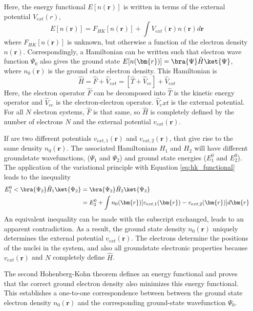 Here, the energy functional $E[n(\bm{r})]$ is written in terms of the external potential $V_{ext}(r)$,
\begin{equation}
	\label{eq:hk_functional}
	E[n(\bm{r})] = F_{HK}[n(\bm{r})]+\int V_{ext}(\bm{r})n(\bm{r})d\bm{r}
\end{equation}
where $F_{HK}[n(\bm{r})]$ is unknown, but otherwise a function of the electron density $n(\bm{r})$.  Correspondingly, a Hamiltonian can be written such that electron wave function $\Psi_0$ also gives the ground state $E[n(\bm{r})]=\bra{\Psi}\hat{H}\ket{\Psi}$, where $n_0(\bm{r})$ is the ground state electron density.  This Hamiltonian is
\begin{equation}
	\hat{H}
	= \hat{F} + \hat{V}_{ext}
	= [\hat{T} + \hat{V}_{ee}] + \hat{V}_{ext}
\end{equation}
Here, the electron operator $\hat{F}$ can be decomposed into  $\hat{T}$ is the kinetic energy operator and  $\hat{V}_{ee}$ is the electron-electron operator.
$\hat{V}_ext$ is the external potential.
For all $N$ electron systems, $\hat{F}$ is that same, so $\hat{H}$ is completely defined by the number of electrons $N$ and the external potential $v_{ext}(\bm{r})$.

If are two different potentials $v_{ext,1}(\bm{r})$ and $v_{ext,2}(\bm{r})$, that give rise to the same density $n_0(\bm{r})$.  The associated Hamiltonians $H_1$ and $H_2$ will have different groundstate wavefunctions, ($\Psi_1$ and $\Psi_2$) and ground state energies ($E_1^0$ and $E_2^0$).  The application of the variational principle with Equation \ref{eq:hk_functional} leads to the inequality
\begin{align}
	E_1^0 < \bra{\Psi_2}\hat{H}_1\ket{\Psi_2}
	      &= \bra{\Psi_2}\hat{H}_2\ket{\Psi_2} \\
	      &= E_2^0
				  + \int
					  n_0(\bm{r})[v_{ext,1}(\bm{r})
						            -v_{ext,2}(\bm{r})]
					d\bm{r}
\end{align}
An equivalent inequality can be made with the subscript exchanged, leads to an apparent contradiction.  As a result, the ground state density $n_0(\bm{r})$ uniquely determines the external potential $v_{ext}{(\bm{r})}$.  The electrons determine the positions of the nuclei in the system, and also all groundstate electronic properties because $v_{ext}(\bm{r})$ and $N$ completely define $\hat{H}$.

The second Hohenberg-Kohn theorem defines an energy functional and proves that the correct ground electron density also minimizes this energy functional.  This establishes a one-to-one correspondence between between the ground state electron density $n_0(\bm{r})$ and the corresponding ground-state wavefunction $\Psi_0$.


